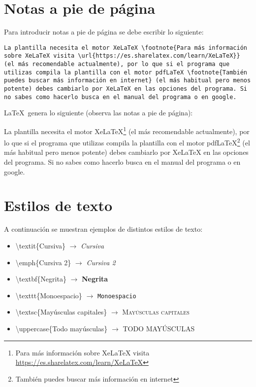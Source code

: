 \section{Notas a pie de página}

Para introducir notas a pie de página se debe escribir lo siguiente:

\begin{lstlisting}[style=Latex-color]
	La plantilla necesita el motor XeLaTeX \footnote{Para más información sobre XeLaTeX visita \url{https://es.sharelatex.com/learn/XeLaTeX}} (el más recomendable actualmente), por lo que si el programa que utilizas compila la plantilla con el motor pdfLaTeX \footnote{También puedes buscar más información en internet} (el más habitual pero menos potente) debes cambiarlo por XeLaTeX en las opciones del programa. Si no sabes como hacerlo busca en el manual del programa o en google.
\end{lstlisting}

\LaTeX~genera lo siguiente (observa las notas a pie de página):
\\
\par La plantilla necesita el motor XeLaTeX\footnote{Para más información sobre XeLaTeX visita \url{https://es.sharelatex.com/learn/XeLaTeX}} (el más recomendable actualmente), por lo que si el programa que utilizas compila la plantilla con el motor pdfLaTeX\footnote{También puedes buscar más información en internet} (el más habitual pero menos potente) debes cambiarlo por XeLaTeX en las opciones del programa. Si no sabes como hacerlo busca en el manual del programa o en google.
\section{Estilos de texto}

A continuación se muestran ejemplos de distintos estilos de texto:

\begin{itemize}
	\item \textbackslash textit\{Cursiva\} $\rightarrow$ \textit{Cursiva}
	\item \textbackslash emph\{Cursiva 2\} $\rightarrow$ \emph{Cursiva 2}
	\item \textbackslash textbf\{Negrita\} $\rightarrow$ \textbf{Negrita}
	\item \textbackslash texttt\{Monoespacio\} $\rightarrow$ \texttt{Monoespacio}
	\item \textbackslash textsc\{Mayúsculas capitales\} $\rightarrow$ \textsc{Mayúsculas capitales}
	\item \textbackslash uppercase\{Todo mayúsculas\} $\rightarrow$ \uppercase{Todo mayúsculas} 
\end{itemize}

